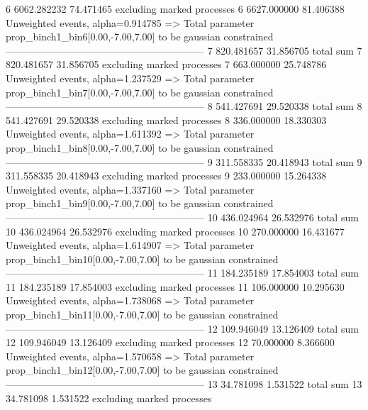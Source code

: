 6          6062.282232     74.471465       excluding marked processes    
6          6627.000000     81.406388       Unweighted events, alpha=0.914785
  => Total parameter prop_binch1_bin6[0.00,-7.00,7.00] to be gaussian constrained
------------------------------------------------------------
7          820.481657      31.856705       total sum                     
7          820.481657      31.856705       excluding marked processes    
7          663.000000      25.748786       Unweighted events, alpha=1.237529
  => Total parameter prop_binch1_bin7[0.00,-7.00,7.00] to be gaussian constrained
------------------------------------------------------------
8          541.427691      29.520338       total sum                     
8          541.427691      29.520338       excluding marked processes    
8          336.000000      18.330303       Unweighted events, alpha=1.611392
  => Total parameter prop_binch1_bin8[0.00,-7.00,7.00] to be gaussian constrained
------------------------------------------------------------
9          311.558335      20.418943       total sum                     
9          311.558335      20.418943       excluding marked processes    
9          233.000000      15.264338       Unweighted events, alpha=1.337160
  => Total parameter prop_binch1_bin9[0.00,-7.00,7.00] to be gaussian constrained
------------------------------------------------------------
10         436.024964      26.532976       total sum                     
10         436.024964      26.532976       excluding marked processes    
10         270.000000      16.431677       Unweighted events, alpha=1.614907
  => Total parameter prop_binch1_bin10[0.00,-7.00,7.00] to be gaussian constrained
------------------------------------------------------------
11         184.235189      17.854003       total sum                     
11         184.235189      17.854003       excluding marked processes    
11         106.000000      10.295630       Unweighted events, alpha=1.738068
  => Total parameter prop_binch1_bin11[0.00,-7.00,7.00] to be gaussian constrained
------------------------------------------------------------
12         109.946049      13.126409       total sum                     
12         109.946049      13.126409       excluding marked processes    
12         70.000000       8.366600        Unweighted events, alpha=1.570658
  => Total parameter prop_binch1_bin12[0.00,-7.00,7.00] to be gaussian constrained
------------------------------------------------------------
13         34.781098       1.531522        total sum                     
13         34.781098       1.531522        excluding marked processes    
